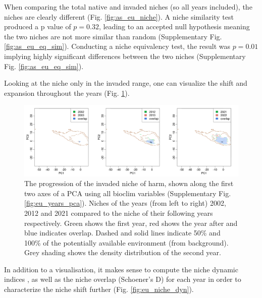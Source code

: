 \documentclass[12pt,a4paper]{article}
\begin{document}
When comparing the total native and invaded niches (so all years included), the niches are clearly different (Fig. \ref{fig:as_eu_niche}).
A niche similarity test produced a p value of $p = 0.32$, leading to an accepted null hypothesis meaning the two niches are not more similar than random (Supplementary Fig. \ref{fig:as_eu_eq_sim}).
Conducting a niche equivalency test, the result was $p = 0.01$ implying highly significant differences between the two niches (Supplementary Fig. \ref{fig:as_eu_eq_sim}).

Looking at the niche only in the invaded range, one can visualize the shift and expansion throughout the years (Fig. \ref{fig:eu_niche_ys}).

\begin{figure}[!h]
    \centering
    \includegraphics[width = \linewidth]{"../../R/figures/eu-niche-ys.png"}
    \caption{\label{fig:eu_niche_ys} The progression of the invaded niche of \gls{harm}, shown along the first two axes of a PCA using all bioclim variables (Supplementary Fig. \ref{fig:eu_years_pca}). Niches of the years (from left to right) 2002, 2012 and 2021 compared to the niche of their following years respectively. Green shows the first year, red shows the year after and blue indicates overlap. Dashed and solid lines indicate 50\% and 100\% of the potentially available environment (from background). Grey shading shows the density distribution of the second year.}

\end{figure}

In addition to a visualisation, it makes sense to compute the niche dynamic indices \autocite{guisan2014nichedyn}, as well as the niche overlap (Schoener's D) for each year in order to characterize the niche shift further (Fig. \ref{fig:eu_niche_dyn}).
\end{document}
